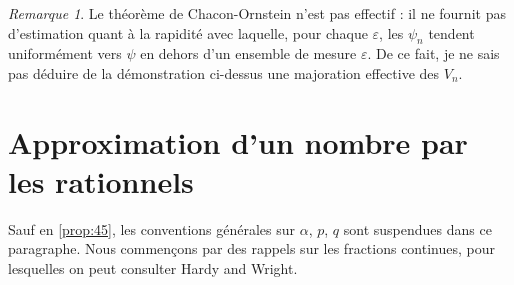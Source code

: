 \documentclass[12pt]{amsart}
\theoremstyle{plain}
\theoremstyle{remark}
\newtheorem{remarque}[theoreme]{Remarque}
\begin{document}
\begin{remarque}\label{rem:310}
Le th\'{e}or\`{e}me de Chacon-Ornstein n'est pas effectif : il ne fournit pas d'estimation quant \`{a} la rapidit\'{e} avec laquelle, pour chaque $\varepsilon$, les $\psi_{n}$ tendent uniform\'{e}ment vers $\psi$ en dehors d'un ensemble de mesure $\varepsilon$. De ce fait, je ne sais pas d\'{e}duire de la d\'{e}monstration ci-dessus une majoration effective des $V_{n}$.
\end{remarque}

\section{Approximation d'un nombre par les rationnels}

Sauf en \ref{prop:45}, les conventions g\'{e}n\'{e}rales sur $\alpha$, $p$, $q$ sont suspendues dans ce paragraphe. Nous commen\c{c}ons par des rappels sur les fractions continues, pour lesquelles on peut consulter Hardy and Wright.
\end{document}
